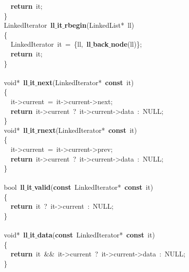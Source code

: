 \documentclass{article}
\begin{document}
\mbox{}\ \ \textbf{return}\ it; \\
\mbox{}\} \\
\mbox{}LinkedIterator\ \textbf{ll$\_$it$\_$rbegin}(LinkedList*\ ll) \\
\mbox{}\{ \\
\mbox{}\ \ LinkedIterator\ it\ =\ \{ll,\ \textbf{ll$\_$back$\_$node}(ll)\}; \\
\mbox{}\ \ \textbf{return}\ it; \\
\mbox{}\} \\
\mbox{} \\
\mbox{}void*\ \textbf{ll$\_$it$\_$next}(LinkedIterator*\ \textbf{const}\ it) \\
\mbox{}\{ \\
\mbox{}\ \ it-\textgreater{}current\ =\ it-\textgreater{}current-\textgreater{}next; \\
\mbox{}\ \ \textbf{return}\ it-\textgreater{}current\ ?\ it-\textgreater{}current-\textgreater{}data\ :\ NULL; \\
\mbox{}\} \\
\mbox{}void*\ \textbf{ll$\_$it$\_$rnext}(LinkedIterator*\ \textbf{const}\ it) \\
\mbox{}\{ \\
\mbox{}\ \ it-\textgreater{}current\ =\ it-\textgreater{}current-\textgreater{}prev; \\
\mbox{}\ \ \textbf{return}\ it-\textgreater{}current\ ?\ it-\textgreater{}current-\textgreater{}data\ :\ NULL; \\
\mbox{}\} \\
\mbox{} \\
\mbox{}bool\ \textbf{ll$\_$it$\_$valid}(\textbf{const}\ LinkedIterator*\ \textbf{const}\ it) \\
\mbox{}\{ \\
\mbox{}\ \ \textbf{return}\ it\ ?\ it-\textgreater{}current\ :\ NULL; \\
\mbox{}\} \\
\mbox{} \\
\mbox{}void*\ \textbf{ll$\_$it$\_$data}(\textbf{const}\ LinkedIterator*\ \textbf{const}\ it) \\
\mbox{}\{ \\
\mbox{}\ \ \textbf{return}\ it\ \&\&\ it-\textgreater{}current\ ?\ it-\textgreater{}current-\textgreater{}data\ :\ NULL; \\
\mbox{}\} \\
\mbox{}
\end{document}
